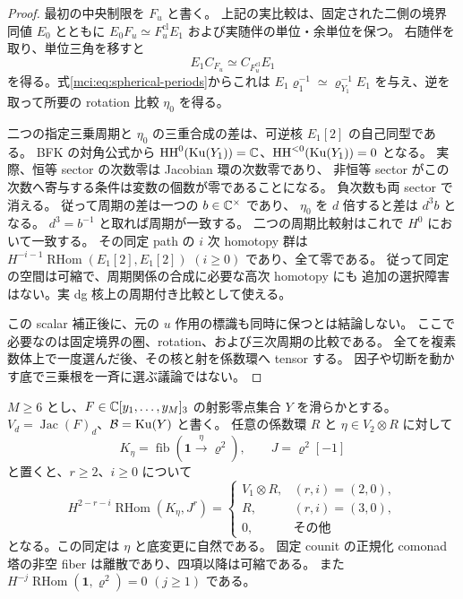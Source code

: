 \begin{proof}
最初の中央制限を $F_u$ と書く。
上記の実比較は、固定された二側の境界同値 $E_0$ とともに
$E_0F_u\simeq F_u^{\mathrm{cl}}E_1$ および実随伴の単位・余単位を保つ。
右随伴を取り、単位三角を移すと
\[
 E_1C_{F_u}\simeq C_{F_u^{\mathrm{cl}}}E_1
\]
を得る。式\eqref{mci:eq:spherical-periods}からこれは
$E_1\varrho_1^{-1}\simeq\varrho_{Y_1}^{-1}E_1$ を与え、逆を取って所要の
rotation 比較 $\eta_0$ を得る。

二つの指定三乗周期と $\eta_0$ の三重合成の差は、可逆核 $E_1[2]$ の自己同型である。
BFK の対角公式\cite[Theorem~5.39]{NFBFKKernels}から
$\operatorname{HH}^0(\operatorname{Ku}(Y_1))=\mathbb C$、$\operatorname{HH}^{<0}(\operatorname{Ku}(Y_1))=0$ となる。
実際、恒等 sector の次数零は Jacobian 環の次数零であり、
非恒等 sector がこの次数へ寄与する条件は変数の個数が零であることになる。
負次数も両 sector で消える。
従って周期の差は一つの $b\in\mathbb C^\times$ であり、
$\eta_0$ を $d$ 倍すると差は $d^3b$ となる。
$d^3=b^{-1}$ と取れば周期が一致する。
二つの周期比較射はこれで $H^0$ において一致する。
その同定 path の $i$ 次 homotopy 群は
$H^{-i-1}\operatorname{RHom}(E_1[2],E_1[2])$ $(i\ge0)$ であり、全て零である。
従って同定の空間は可縮で、周期関係の合成に必要な高次 homotopy にも
追加の選択障害はない。実 dg 核上の周期付き比較として使える。

この scalar 補正後に、元の $u$ 作用の標識も同時に保つとは結論しない。
ここで必要なのは固定境界の圏、rotation、および三次周期の比較である。
全てを複素数体上で一度選んだ後、その核と射を係数環へ tensor する。
因子や切断を動かす底で三乗根を一斉に選ぶ議論ではない。
\end{proof}

\begin{lemma}[変数数を三の倍数に限らない比較群]
\label{mci:lem:smooth-cubic-arity}
$M\ge6$ とし、$F\in\mathbb C[y_1,\ldots,y_M]_3$ の射影零点集合 $Y$ を滑らかとする。
$V_d=\operatorname{Jac}(F)_d$、$\mathcal B=\operatorname{Ku}(Y)$ と書く。
任意の係数環 $R$ と $\eta\in V_2\otimes R$ に対して
\[
 K_\eta=\operatorname{fib}(\mathbf1\xrightarrow{\eta}\varrho^2),\qquad
 J=\varrho^2[-1]
\]
と置くと、$r\ge2$、$i\ge0$ について
\begin{equation}\label{mci:eq:arity}
 H^{2-r-i}\operatorname{RHom}(K_\eta,J^r)=
 \begin{cases}
  V_1\otimes R,&(r,i)=(2,0),\\
  R,&(r,i)=(3,0),\\
  0,&\text{その他}
 \end{cases}
\end{equation}
となる。この同定は $\eta$ と底変更に自然である。
固定 counit の正規化 comonad 塔の非空 fiber は離散であり、四項以降は可縮である。
また $H^{-j}\operatorname{RHom}(\mathbf1,\varrho^2)=0$ $(j\ge1)$ である。
\end{lemma}

